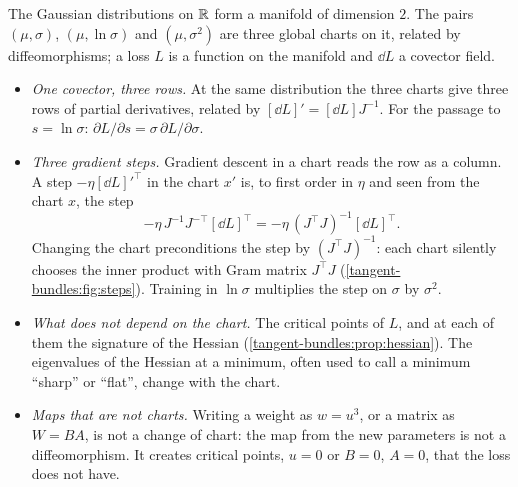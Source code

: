 \begin{notechapter}
\begin{mlthread}
The Gaussian distributions on $\mathbb{R}$ form a manifold of dimension $2$. The
pairs $(\mu, \sigma)$, $(\mu, \ln\sigma)$ and $(\mu, \sigma^2)$ are three
global charts on it, related by diffeomorphisms; a loss $L$ is a function
on the manifold and $\dd L$ a covector field.
\begin{itemize}[nosep]
  \item \emph{One covector, three rows.} At the same distribution the
        three charts give three rows of partial derivatives, related by
        $[\dd L]' = [\dd L]J^{-1}$. For the passage to
        $s = \ln\sigma$: $\partial L/\partial s
        = \sigma\,\partial L/\partial\sigma$.
  \item \emph{Three gradient steps.} Gradient descent in a chart reads
        the row as a column. A step $-\eta[\dd L]'^\top$ in the chart
        $x'$ is, to first order in $\eta$ and seen from the chart $x$,
        the step
        \[
          -\eta\,J^{-1}J^{-\top}[\dd L]^\top
          = -\eta\,(J^\top J)^{-1}[\dd L]^\top .
        \]
        Changing the chart preconditions the step by $(J^\top J)^{-1}$:
        each chart silently chooses the inner product with Gram matrix
        $J^\top J$ (\cref{tangent-bundles:fig:steps}). Training in
        $\ln\sigma$ multiplies the step on $\sigma$ by $\sigma^2$.
  \item \emph{What does not depend on the chart.} The critical points of
        $L$, and at each of them the signature of the Hessian
        (\cref{tangent-bundles:prop:hessian}). The eigenvalues of the
        Hessian at a minimum, often used to call a minimum ``sharp'' or
        ``flat'', change with the chart.
  \item \emph{Maps that are not charts.} Writing a weight as $w = u^3$,
        or a matrix as $W = BA$, is not a change of chart: the map from
        the new parameters is not a diffeomorphism. It creates critical
        points, $u = 0$ or $B = 0$, $A = 0$, that the loss does not
        have.
\end{itemize}
\end{mlthread}


\end{notechapter}
